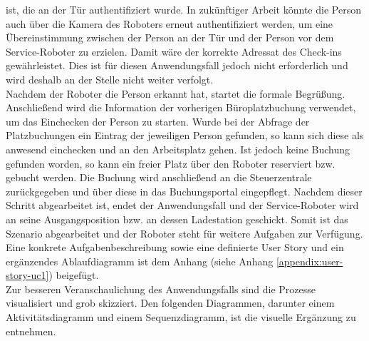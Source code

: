     ist, die an der Tür authentifiziert wurde. In zukünftiger Arbeit könnte die Person auch über die Kamera des Roboters erneut 
    authentifiziert werden, um eine Übereinstimmung zwischen der Person an der Tür und der Person vor dem Service-Roboter zu 
    erzielen. Damit wäre der korrekte Adressat des Check-ins gewährleistet. Dies ist für diesen Anwendungsfall jedoch nicht erforderlich und 
    wird deshalb an der Stelle nicht weiter verfolgt.
    \\
    \linebreak
    Nachdem der Roboter die Person erkannt hat, startet die formale Begrüßung. Anschließend wird die Information der 
    vorherigen Büroplatzbuchung verwendet, um das Einchecken der Person zu starten. Wurde bei der Abfrage der Platzbuchungen ein 
    Eintrag der jeweiligen Person gefunden, so kann sich diese als anwesend einchecken und an den Arbeitsplatz gehen. Ist jedoch keine 
    Buchung gefunden worden, so kann ein freier Platz über den Roboter reserviert bzw. gebucht werden. Die Buchung wird 
    anschließend an die Steuerzentrale zurückgegeben und über diese in das Buchungsportal eingepflegt. Nachdem dieser 
    Schritt abgearbeitet ist, endet der Anwendungsfall und der Service-Roboter wird an seine Ausgangsposition bzw. an dessen 
    Ladestation geschickt. Somit ist das Szenario abgearbeitet und der Roboter steht für weitere Aufgaben zur Verfügung. 
    \\
    \linebreak
    Eine konkrete Aufgabenbeschreibung sowie eine definierte User Story und ein ergänzendes Ablaufdiagramm ist dem Anhang (siehe Anhang \ref{appendix:user-story-uc1}) beigefügt. 
    \\
    Zur besseren Veranschaulichung des Anwendungsfalls sind die Prozesse visualisiert und grob skizziert. Den folgenden Diagrammen, darunter 
    einem Aktivitätsdiagramm und einem Sequenzdiagramm, 
    ist die visuelle Ergänzung zu entnehmen. 
